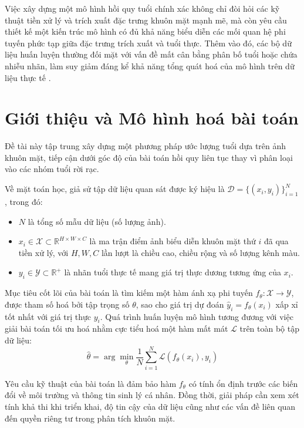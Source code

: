 Việc xây dựng một mô hình hồi quy tuổi chính xác không chỉ đòi hỏi các kỹ thuật tiền xử lý và trích xuất đặc trưng khuôn mặt mạnh mẽ, mà còn yêu cầu thiết kế một kiến trúc mô hình có đủ khả năng biểu diễn các mối quan hệ phi tuyến phức tạp giữa đặc trưng trích xuất và tuổi thực. Thêm vào đó, các bộ dữ liệu huấn luyện thường đối mặt với vấn đề mất cân bằng phân bố tuổi hoặc chứa nhiễu nhãn, làm suy giảm đáng kể khả năng tổng quát hoá của mô hình trên dữ liệu thực tế \cite{Levi2015AgeGender,Rothe2015DEX}.

\section{Giới thiệu và Mô hình hoá bài toán}
Đề tài này tập trung xây dựng một phương pháp ước lượng tuổi dựa trên ảnh khuôn mặt, tiếp cận dưới góc độ của bài toán hồi quy liên tục thay vì phân loại vào các nhóm tuổi rời rạc. 

Về mặt toán học, giả sử tập dữ liệu quan sát được ký hiệu là $\mathcal{D} = \{(x_i, y_i)\}_{i=1}^N$, trong đó:
\begin{itemize}
    \item $N$ là tổng số mẫu dữ liệu (số lượng ảnh).
    \item $x_i \in \mathcal{X} \subset \mathbb{R}^{H \times W \times C}$ là ma trận điểm ảnh biểu diễn khuôn mặt thứ $i$ đã qua tiền xử lý, với $H, W, C$ lần lượt là chiều cao, chiều rộng và số lượng kênh màu.
    \item $y_i \in \mathcal{Y} \subset \mathbb{R}^+$ là nhãn tuổi thực tế mang giá trị thực dương tương ứng của $x_i$.
\end{itemize}

Mục tiêu cốt lõi của bài toán là tìm kiếm một hàm ánh xạ phi tuyến $f_\theta: \mathcal{X} \rightarrow \mathcal{Y}$, được tham số hoá bởi tập trọng số $\theta$, sao cho giá trị dự đoán $\hat{y}_i = f_\theta(x_i)$ xấp xỉ tốt nhất với giá trị thực $y_i$. Quá trình huấn luyện mô hình tương đương với việc giải bài toán tối ưu hoá nhằm cực tiểu hoá một hàm mất mát $\mathcal{L}$ trên toàn bộ tập dữ liệu:
$$ \hat{\theta} = \arg\min_{\theta} \frac{1}{N} \sum_{i=1}^{N} \mathcal{L}(f_\theta(x_i), y_i) $$

Yêu cầu kỹ thuật của bài toán là đảm bảo hàm $f_\theta$ có tính ổn định trước các biến đổi về môi trường và thông tin sinh lý cá nhân. Đồng thời, giải pháp cần xem xét tính khả thi khi triển khai, độ tin cậy của dữ liệu cũng như các vấn đề liên quan đến quyền riêng tư trong phân tích khuôn mặt.


